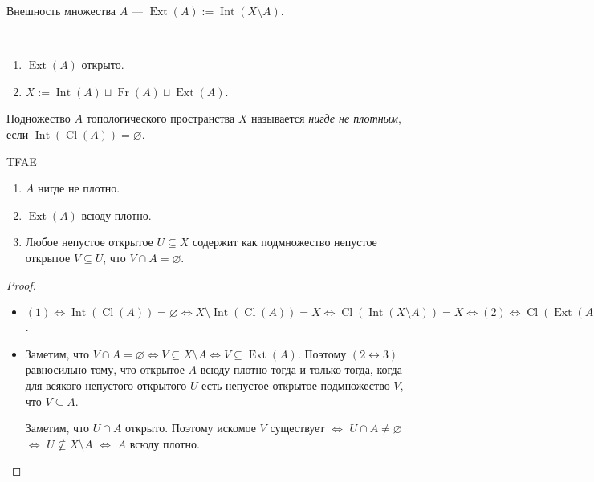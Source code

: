 \documentclass[12pt,a4paper]{article}
\DeclareMathOperator{\Int}{Int}
\DeclareMathOperator{\Ext}{Ext}
\DeclareMathOperator{\Cl}{Cl}
\DeclareMathOperator{\Fr}{Fr}
\begin{document}
    \begin{definition}
        Внешность множества $A$ --- $\Ext(A) := \Int(X \setminus A)$.
    \end{definition}

    \begin{lemma}\ 
        \begin{enumerate}
            \item $\Ext(A)$ открыто.
            \item $X := \Int(A) \sqcup \Fr(A) \sqcup \Ext(A)$.
        \end{enumerate}
    \end{lemma}

    \begin{definition}
        Подножество $A$ топологического пространства $X$ называется \emph{нигде не плотным}, если $\Int(\Cl(A)) = \varnothing$.
    \end{definition}

    \begin{lemma}
        TFAE
        \begin{enumerate}
            \item $A$ нигде не плотно.
            \item $\Ext(A)$ всюду плотно.
            \item Любое непустое открытое $U \subseteq X$ содержит как подмножество непустое открытое $V \subseteq U$, что $V \cap A = \varnothing$.
        \end{enumerate}
    \end{lemma}

    \begin{proof}
        \begin{itemize}
            \item $(1) \Leftrightarrow \Int(\Cl(A)) = \varnothing \Leftrightarrow X \setminus \Int(\Cl(A)) = X \Leftrightarrow \Cl(\Int(X \setminus A)) = X \Leftrightarrow (2) \Leftrightarrow \Cl(\Ext(A)) = X$.
            \item Заметим, что $V \cap A = \varnothing \Leftrightarrow V \subseteq X \setminus A \Leftrightarrow V \subseteq \Ext(A)$. Поэтому $(2 \leftrightarrow 3)$ равносильно тому, что открытое $A$ всюду плотно тогда и только тогда, когда для всякого непустого открытого $U$ есть непустое открытое подмножество $V$, что $V \subseteq A$.

            Заметим, что $U \cap A$ открыто. Поэтому искомое $V$ существует $\Leftrightarrow$ $U \cap A \neq \varnothing$ $\Leftrightarrow$ $U \nsubseteq X \setminus A$ $\Leftrightarrow$ $A$ всюду плотно.
        \end{itemize}
    \end{proof}
\end{document}
